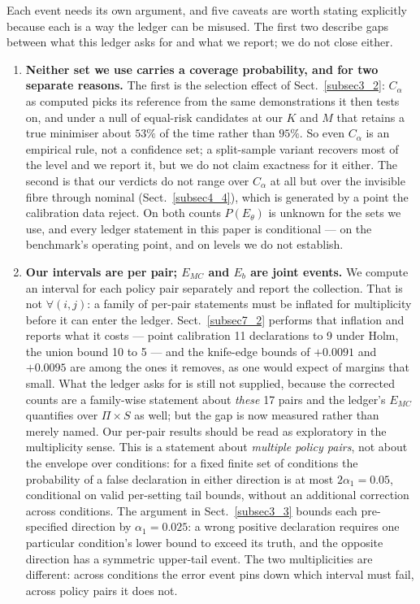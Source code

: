 \documentclass[pdflatex,iicol,sn-apa]{sn-jnl}
\theoremstyle{remark}
\begin{document}
\begin{appendices}
Each event needs its own argument, and five caveats are worth stating explicitly because each is a
way the ledger can be misused. The first two describe gaps between what this ledger asks for and what
we report; we do not close either.

\begin{enumerate}
\item \textbf{Neither set we use carries a coverage probability, and for two separate reasons.}
The first is the selection effect of Sect.~\ref{subsec3_2}: $C_\alpha$ as computed picks its
reference from the same demonstrations it then tests on, and under a null of equal-risk candidates
at our $K$ and $M$ that retains a true minimiser about $53\%$ of the time rather than $95\%$. So
even $C_\alpha$ is an empirical rule, not a confidence set; a split-sample variant recovers most of
the level and we report it, but we do not claim exactness for it either. The second is that our
verdicts do not range over $C_\alpha$ at all but over the invisible fibre through nominal
(Sect.~\ref{subsec4_4}), which is generated by a point the calibration data reject. On both counts
$P(E_\theta)$ is unknown for the sets we use, and every ledger statement in this paper is
conditional --- on the benchmark's operating point, and on levels we do not establish.

\item \textbf{Our intervals are per pair; $E_{MC}$ and $E_b$ are joint events.} We compute an
interval for each policy pair separately and report the collection. That is not
$\forall (i,j)$: a family of per-pair statements must be inflated for multiplicity before it can
enter the ledger. Sect.~\ref{subsec7_2} performs that inflation and reports what it costs --- point
calibration 11 declarations to 9 under Holm, the union bound 10 to 5 --- and the knife-edge bounds
of $+0.0091$ and $+0.0095$ are among the ones it removes, as one would expect of margins that small.
What the ledger asks for is still not supplied, because the corrected counts are a family-wise
statement about \emph{these} 17 pairs and the ledger's $E_{MC}$ quantifies over $\Pi \times S$ as
well; but the gap is now measured rather than merely named.
Our per-pair results should be read as exploratory in the multiplicity sense. This is a statement
about \emph{multiple policy pairs}, not about the envelope over conditions: for a fixed finite set
of conditions the probability of a false declaration in either direction is at most
$2\alpha_1 = 0.05$, conditional on valid per-setting tail bounds, without an additional correction
across conditions. The argument in Sect.~\ref{subsec3_3} bounds each pre-specified direction by
$\alpha_1 = 0.025$: a wrong positive declaration requires one particular condition's lower bound
to exceed its truth, and the opposite direction has a symmetric upper-tail event. The two multiplicities are different: across conditions the
error event pins down which interval must fail, across policy pairs it does not.


\end{enumerate}
\end{appendices}
\end{document}
